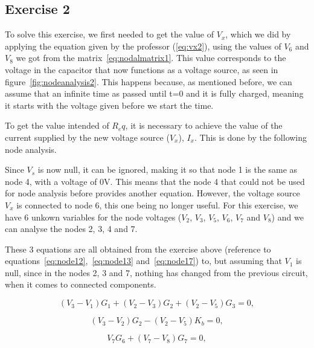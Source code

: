 \subsection{Exercise 2}
\label{sec:exercise2}

To solve this exercise, we first needed to get the value of $V_x$, which we did by applying the equation given by the professor (\ref{eq:vx2}), using the values of $V_6$ and $V_8$ we got from the matrix~\ref{eq:nodalmatrix1}. This value corresponds to the voltage in the capacitor that now functions as a voltage source, as seen in figure~\ref{fig:nodeanalysis2}. This happens because, as mentioned before, we can assume that an infinite time as passed until t=0 and it is fully charged, meaning it starts with the voltage given before we start the time.

To get the value intended of $R_eq$, it is necessary to achieve the value of the current supplied by the new voltage source ($V_x$), $I_x$. This is done by the following node analysis.

Since $V_s$ is now null, it can be ignored, making it so that node 1 is the same as node 4, with a voltage of 0V. This means that the node 4 that could not be used for node analysis before provides another equation. However, the voltage source $V_x$ is connected to node 6, this one being no longer useful. For this exercise, we have 6 unkown variables for the node voltages ($V_2$, $V_3$, $V_5$, $V_6$, $V_7$ and $V_8$) and we can analyse the nodes 2, 3, 4 and 7.

These 3 equations are all obtained from the exercise above (reference to equations~\ref{eq:node12},~\ref{eq:node13} and~\ref{eq:node17}) to, but assuming that $V_1$ is null, since in the nodes 2, 3 and 7, nothing has changed from the previous circuit, when it comes to connected components.

\begin{equation}
  (V_{3} - V_{1})G_{1} + (V_{2} - V_{3})G_{2} + (V_{2} - V_{5})G_{3}= 0,
  \label{eq:node22}
\end{equation}

\begin{equation}
  (V_{3} - V_{2})G_{2} - (V_{2} - V_{5})K_{b} = 0,
  \label{eq:node23}
\end{equation}

\begin{equation}
  V_{7}G_{6} + (V_{7} - V_{8})G_{7} = 0,
  \label{eq:node27}
\end{equation}

